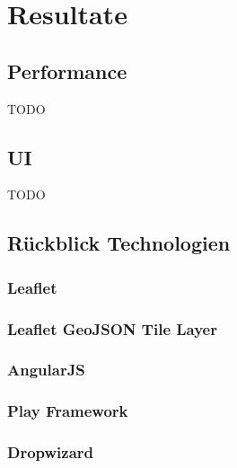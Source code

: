 
\chapter{Resultate}
\section{Performance}
TODO
\section{UI}
TODO
\section{Rückblick Technologien}
\subsection*{Leaflet}
\subsection*{Leaflet GeoJSON Tile Layer}
\subsection*{AngularJS}
\subsection*{Play Framework}
\subsection*{Dropwizard}
